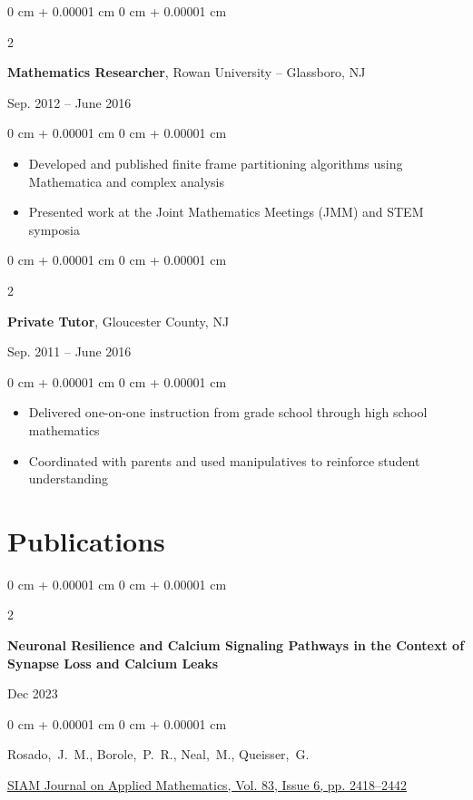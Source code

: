 \documentclass[10pt, letterpaper]{article}
\newenvironment{highlights}{
    \begin{itemize}[
        topsep=0.10 cm,
        parsep=0.10 cm,
        partopsep=0pt,
        itemsep=0pt,
        leftmargin=0 cm + 10pt
    ]
}{
    \end{itemize}
} %
\newenvironment{onecolentry}{
    \begin{adjustwidth}{
        0 cm + 0.00001 cm
    }{
        0 cm + 0.00001 cm
    }
}{
    \end{adjustwidth}
} %
\newenvironment{twocolentry}[2][]{
    \onecolentry
    \def\secondColumn{#2}
    \setcolumnwidth{\fill, 4.5 cm}
    \begin{paracol}{2}
}{
    \switchcolumn \raggedleft \secondColumn
    \end{paracol}
    \endonecolentry
} %
\begin{document}
\vspace{0.2 cm}

\begin{twocolentry}{
    Sep. 2012 – June 2016
}
    \textbf{Mathematics Researcher}, Rowan University -- Glassboro, NJ
\end{twocolentry}

\vspace{0.10 cm}
\begin{onecolentry}
    \begin{highlights}
        \item Developed and published finite frame partitioning algorithms using Mathematica and complex analysis
        \item Presented work at the Joint Mathematics Meetings (JMM) and STEM symposia
    \end{highlights}
\end{onecolentry}

\vspace{0.2 cm}

\begin{twocolentry}{
    Sep. 2011 – June 2016
}
    \textbf{Private Tutor}, Gloucester County, NJ
\end{twocolentry}

\vspace{0.10 cm}
\begin{onecolentry}
    \begin{highlights}
        \item Delivered one-on-one instruction from grade school through high school mathematics
        \item Coordinated with parents and used manipulatives to reinforce student understanding
    \end{highlights}
\end{onecolentry}

\section{Publications}

\begin{samepage}
    \begin{twocolentry}{
        Dec 2023
    }
        \textbf{Neuronal Resilience and Calcium Signaling Pathways in the Context of Synapse Loss and Calcium Leaks}
    \end{twocolentry}

    \vspace{0.10 cm}

    \begin{onecolentry}
        \mbox{Rosado, J. M.}, \mbox{Borole, P. R.}, \mbox{Neal, M.}, \mbox{Queisser, G.}

        \vspace{0.10 cm}

        \href{https://doi.org/10.1137/22M1512131}{SIAM Journal on Applied Mathematics, Vol. 83, Issue 6, pp. 2418–2442}
    \end{onecolentry}
\end{samepage}
\end{document}

